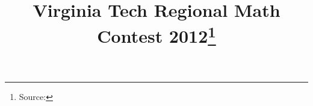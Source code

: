 \documentclass[10pt]{article}
\begin{document}
\title{Virginia Tech Regional Math Contest 2012\footnote{Source: \source}}
\author{\vspace{-2ex}}
\date{\vspace{-6ex}} %
\maketitle







\end{document}
